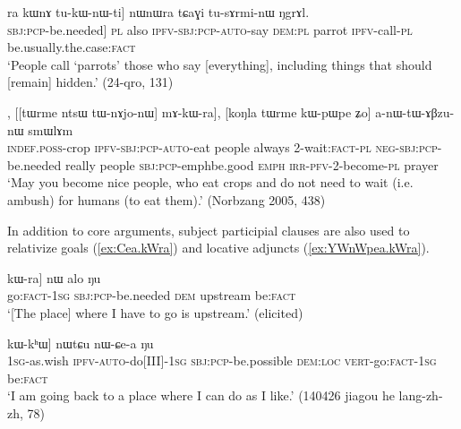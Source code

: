 \begin{exe}
\ex \label{ex:kAnWtsW.kWra}
\gll [kɤ-nɯtsɯ kɯ-ra] ra kɯnɤ tu-kɯ-nɯ-ti] nɯnɯra tɕaɣi tu-sɤrmi-nɯ ŋgrɤl. \\
[[[\textsc{inf}-hide] \textsc{sbj}:\textsc{pcp}-be.needed] \textsc{pl} also \textsc{ipfv}-\textsc{sbj}:\textsc{pcp}-\textsc{auto}-say \textsc{dem}:\textsc{pl} parrot \textsc{ipfv}-call-\textsc{pl} be.usually.the.case:\textsc{fact} \\
\glt `People call `parrots' those who say [everything], including things that should [remain] hidden.' (24-qro, 131)
\end{exe}

\begin{exe}
\ex \label{ex:tWnAjonW.kWra}
, [[tɯrme ntsɯ tɯ-nɤjo-nɯ] mɤ-kɯ-ra], [koŋla tɯrme kɯ-pɯ\redp{}pe ʑo] a-nɯ-tɯ-ɤβzu-nɯ smɯlɤm \\
\textsc{indef}.\textsc{poss}-crop \textsc{ipfv}-\textsc{sbj}:\textsc{pcp}-\textsc{auto}-eat people always 2-wait:\textsc{fact}-\textsc{pl} \textsc{neg}-\textsc{sbj}:\textsc{pcp}-be.needed really people \textsc{sbj}:\textsc{pcp}-emph\redp{}be.good \textsc{emph} \textsc{irr}-\textsc{pfv}-2-become-\textsc{pl} prayer \\
\glt `May you become nice people, who eat crops and do not need to wait (i.e. ambush) for humans (to eat them).' (Norbzang 2005, 438)
\end{exe}

In addition to core arguments, subject participial clauses are also used to relativize goals (\ref{ex:Cea.kWra}) and locative adjuncts (\ref{ex:YWnWpea.kWra}).
 
\begin{exe}
\ex \label{ex:Cea.kWra}
\gll [[ɕe-a] kɯ-ra] nɯ alo ŋu \\
go:\textsc{fact}-\textsc{1sg} \textsc{sbj}:\textsc{pcp}-be.needed \textsc{dem} upstream be:\textsc{fact} \\
\glt  `[The place] where I have to go is upstream.' (elicited)
\end{exe}

\begin{exe}
\ex \label{ex:YWnWpea.kWra}
\gll [[aʑo-sɯso ɲɯ-nɯ-pe-a] kɯ-kʰɯ] nɯtɕu nɯ-ɕe-a ŋu \\
\textsc{1sg}-as.wish \textsc{ipfv}-\textsc{auto}-do[III]-\textsc{1sg} \textsc{sbj}:\textsc{pcp}-be.possible \textsc{dem}:\textsc{loc} \textsc{vert}-go:\textsc{fact}-\textsc{1sg} be:\textsc{fact} \\
\glt  `I am going back to a place where I can do as I like.' (140426 jiagou he lang-zh-zh, 78)
\end{exe}

